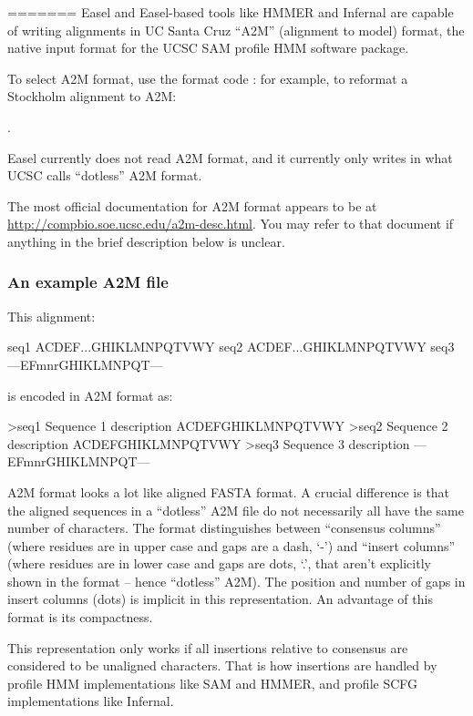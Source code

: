 =======
Easel and Easel-based tools like HMMER and Infernal are capable of
writing alignments in UC Santa Cruz ``A2M'' (alignment to model)
format, the native input format for the UCSC SAM profile HMM software
package.

To select A2M format, use the format code : for example, 
to reformat a Stockholm alignment to A2M:

.

Easel currently does not read A2M format, and it currently only writes
in what UCSC calls ``dotless'' A2M format.

The most official documentation for A2M format appears to be at
\url{http://compbio.soe.ucsc.edu/a2m-desc.html}. You may refer to that
document if anything in the brief description below is unclear.

\subsubsection{An example A2M file}

This alignment:

\begin{cchunk}
seq1  ACDEF...GHIKLMNPQTVWY
seq2  ACDEF...GHIKLMNPQTVWY
seq3  ---EFmnrGHIKLMNPQT---
\end{cchunk}

\noindent 
is encoded in A2M format as:

\begin{cchunk}
>seq1  Sequence 1 description
ACDEFGHIKLMNPQTVWY
>seq2  Sequence 2 description
ACDEFGHIKLMNPQTVWY
>seq3  Sequence 3 description
---EFmnrGHIKLMNPQT---
\end{cchunk}

A2M format looks a lot like aligned FASTA format. A crucial difference
is that the aligned sequences in a ``dotless'' A2M file do not
necessarily all have the same number of characters. The format
distinguishes between ``consensus columns'' (where residues are in
upper case and gaps are a dash, `-') and ``insert columns'' (where
residues are in lower case and gaps are dots, `.', that aren't
explicitly shown in the format -- hence ``dotless'' A2M). The position
and number of gaps in insert columns (dots) is implicit in this
representation.  An advantage of this format is its compactness.

This representation only works if all insertions relative to consensus
are considered to be unaligned characters. That is how insertions are
handled by profile HMM implementations like SAM and HMMER, and profile
SCFG implementations like Infernal.

